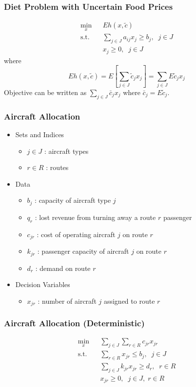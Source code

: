 \documentclass[12pt,handout]{beamer}
\begin{document}
\begin{frame}
\frametitle{Diet Problem with Uncertain Food Prices}
\begin{eqnarray}
\min_x && Eh(x, \tilde{c}) \nonumber \\
\mbox{s.t.} && \sum_{j \in J} a_{ij} x_j \ge b_j,\;\;j \in J \nonumber \\
&& x_j \ge 0,\;\;j \in J \nonumber
\end{eqnarray}
where
\begin{equation}
Eh(x, \tilde{c}) = E[\sum_{j \in J} \tilde{c}_j x_j] = \sum_{j \in J} E\tilde{c}_j x_j \nonumber
\end{equation}
Objective can be written as $\sum_{j \in J} \bar{c}_j x_j$ where $\bar{c}_j = E \tilde{c}_j$. \\
\end{frame}

\begin{frame}
\frametitle{Aircraft Allocation}
\begin{itemize}
    \item Sets and Indices
    \begin{itemize}
        \item $j \in J$ : aircraft types
        \item $r \in R$ : routes
    \end{itemize}
    \item Data
    \begin{itemize}
        \item $b_j$ : capacity of aircraft type $j$
        \item $q_r$ : lost revenue from turning away a route $r$ passenger
        \item $c_{jr}$ : cost of operating aircraft $j$ on route $r$
        \item $k_{jr}$ : passenger capacity of aircraft $j$ on route $r$
        \item $d_r$ : demand on route $r$
    \end{itemize}
    \item Decision Variables
    \begin{itemize}
        \item $x_{jr}$ : number of aircraft $j$ assigned to route $r$
    \end{itemize}
\end{itemize}
\end{frame}

\begin{frame}
\frametitle{Aircraft Allocation (Deterministic)}
\begin{eqnarray}
\min_x && \sum_{j \in J} \sum_{r \in R} c_{jr} x_{jr} \nonumber \\
\mbox{s.t.} && \sum_{r \in R} x_{jr} \le b_j,\;\;j \in J \nonumber \\
&& \sum_{j \in J} k_{jr} x_{jr} \ge d_r,\;\;r \in R \nonumber \\
&& x_{jr} \ge 0,\;\;j \in J,\;r \in R \nonumber
\end{eqnarray}
\end{frame}
\end{document}
